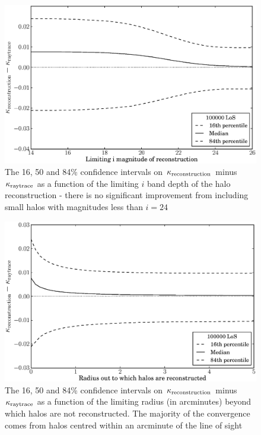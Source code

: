 \documentclass[useAMS,usenatbib]{mn2e}
\begin{document}
\begin{figure}
\includegraphics[width=\columnwidth]{mag_scatter.eps}
\caption[magcut]{The 16, 50 and 84\% confidence intervals on $\kappa_{\rm reconstruction}$ minus $\kappa_{\rm raytrace}$ as a function of the limiting $i$ band depth of the halo reconstruction - there is no significant improvement from including small halos with magnitudes less than $i=24$}
\label{fig:magcut}
\end{figure}
\begin{figure}
\includegraphics[width=\columnwidth]{radius_scatter.eps}
\caption[radius cut]{The 16, 50 and 84\% confidence intervals on $\kappa_{\rm reconstruction}$ minus $\kappa_{\rm raytrace}$ as a function of the limiting radius (in arcminutes) beyond which halos are not reconstructed. The majority of the convergence comes from halos centred within an arcminute of the line of sight}
\label{fig:radcut}
\end{figure}
\end{document}
